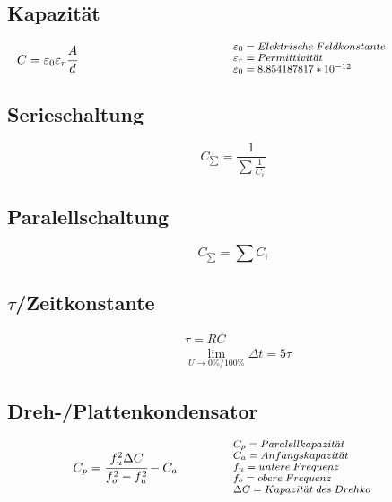 \documentclass[12pt,a5paper,ngerman,titlepage]{article}
\begin{document}
\subsection{Kapazität}
\[
\begin{minipage}{.5\linewidth}
	
  $C = \varepsilon_{0} \varepsilon_{r} \cfrac{A}{d}$
\end{minipage}%
\begin{minipage}{.5\linewidth}
  \fontsize{8pt}{9pt}\selectfont
  $\varepsilon_{0} = Elektrische \; Feldkonstante$ \\
  $\varepsilon_{r} = Permittivit\ddot{a}t$ \\
  $\varepsilon_{0} = 8.854187817*10^{-12}$

\end{minipage}
\]

\subsection{Serieschaltung}
$$C_{\sum} = \frac{1}{\sum \frac{1}{C_{i}}}$$

\subsection{Paralellschaltung}
$$C_{\sum} = \sum C_{i}$$

\subsection{$\tau$/Zeitkonstante}
\begin{align*}
&\tau = RC\\[5pt]
&\lim_{U \to 0\%/100\%}\Delta t = 5\tau 
\end{align*}

\subsection{Dreh-/Plattenkondensator}
\[
\begin{minipage}{.5\linewidth}
  \centering
  $C_{p}=\cfrac{f_{u}^2 \Delta C}{f_{o}^2-f_{u}^2}-C_{a}$
\end{minipage}%
\begin{minipage}{.5\linewidth}
\fontsize{8pt}{9pt}\selectfont
  $C_{p} = Paralellkapazit\ddot{a}t$ \\
  $C_{a} = Anfangskapazit\ddot{a}t$ \\
  $f_{u} = untere \; Frequenz$ \\
  $f_{o} = obere \; Frequenz$ \\
  $\Delta C = Kapazit\ddot{a}t \; des \; Drehko$ 
\end{minipage}
\]
\end{document}
